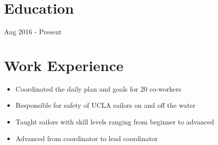 \documentclass{resume}
\begin{document}
\section{Education}
\begin{schools}{Aug 2016 - Present}
\end{schools}


\section{Work Experience}
\begin{itemize}
  \item Coordinated the daily plan and goals for 20 co-workers
  \item Responsible for safety of UCLA sailors on and off the water
  \item Taught sailors with skill levels ranging from beginner to advanced
  \item Advanced from coordinator to lead coordinator
\end{itemize}
\end{document}
